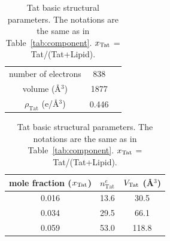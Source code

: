 \begin{table}[htbp]
  \centering
  \begin{tabular}{c c c}
    \hline
    number of electrons & 838 \\ 
    volume (\AA$^3$) & 1877 \\
    $\rho_\textrm{Tat}$ (e/\AA$^3$) & 0.446 \\
    \hline
  \end{tabular}
  \quad
  \begin{tabular}{ ccc }
    \hline
    mole fraction ($x_\textrm{Tat}$) & $n^e_\textrm{Tat}$ & $V_\textrm{Tat}$ (\AA$^3$) \\    
    \hline
    0.016 & 13.6 & 30.5 \\
    0.034 & 29.5 & 66.1 \\
    0.059 & 53.0 & 118.8 \\
    \hline
  \end{tabular}
  \caption{Tat basic structural parameters. The notations are the same
  as in Table~\ref{tab:component}. $x_\textrm{Tat}$ = Tat/(Tat+Lipid).}
  \label{tab:Tat_basic_params}
\end{table}


